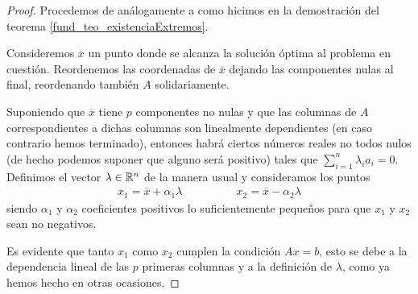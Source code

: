 \begin{proof}
	Procedemos de análogamente a como hicimos en la demostración del teorema \ref{fund_teo_existenciaExtremos}.
	
	Consideremos $\overline{x}$ un punto donde se alcanza la solución óptima al problema en cuestión. Reordenemos las coordenadas de $\overline{x}$ dejando las componentes nulas al final, reordenando también $A$ solidariamente.
	
	Suponiendo que $\overline{x}$ tiene $p$ componentes no nulas y que las columnas de $A$ correspondientes a dichas columnas son linealmente dependientes (en caso contrario hemos terminado), entonces habrá ciertos números reales no todos nulos (de hecho podemos suponer que alguno será positivo) tales que $\sum_{i=1}^{n}\lambda_ia_i=0$. Definimos el vector $\lambda\in\mathbb{R}^n$ de la manera usual y consideramos los puntos
	\begin{equation*}
		\begin{array}{cc}
		x_1=\overline{x}+\alpha_1\lambda\qquad&\qquad x_2=\overline{x}-\alpha_2\lambda
		\end{array}
	\end{equation*}
	siendo $\alpha_1$ y $\alpha_2$ coeficientes positivos lo suficientemente pequeños para que $x_1$ y $x_2$ sean no negativos.
	
	Es evidente que tanto $x_1$ como $x_2$ cumplen la condición $Ax=b$, esto se debe a la dependencia lineal de las $p$ primeras columnas y a la definición de $\lambda$, como ya hemos hecho en otras ocasiones.
	

\end{proof}
